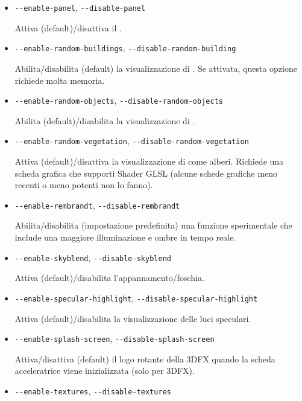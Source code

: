 \begin{itemize}
{\begin{itemize}
  \item{\texttt{-$ $-enable-panel}, \texttt{-$ $-disable-panel}}

  Attiva (default)/disattiva il .

  \item{\texttt{-$ $-enable-random-buildings}, \texttt{-$ $-disable-random-building}}

  Abilita/disabilita (default) la visualizzazione di .
  Se attivata, questa opzione richiede molta memoria.

  \item{\texttt{-$ $-enable-random-objects}, \texttt{-$ $-disable-random-objects}}

  Abilita (default)/disabilita la visualizzazione di .

  \item{\texttt{-$ $-enable-random-vegetation}, \texttt{-$ $-disable-random-vegetation}}

  Attiva (default)/disattiva la visualizzazione di  come alberi.
  Richiede una scheda grafica che supporti Shader GLSL (alcune schede grafiche meno
  recenti o meno potenti non lo fanno).

  \item{\texttt{-$ $-enable-rembrandt}, \texttt{-$ $-disable-rembrandt}}

  Abilita/disabilita (impostazione predefinita) una funzione sperimentale che
  include una maggiore illuminazione e ombre in tempo reale.

  \item{\texttt{-$ $-enable-skyblend}, \texttt{-$ $-disable-skyblend}}

  Attiva (default)/disabilita l'appannamento/foschia.

  \item{\texttt{-$ $-enable-specular-highlight}, \texttt{-$ $-disable-specular-highlight}}

  Attiva (default)/disabilita la visualizzazione delle luci speculari.

  \item{\texttt{-$ $-enable-splash-screen}, \texttt{-$ $-disable-splash-screen}}

  Attiva/disattiva (default) il logo rotante della 3DFX quando la scheda acceleratrice viene inizializzata (solo per 3DFX).

  \item{\texttt{-$ $-enable-textures}, \texttt{-$ $-disable-textures}}


\end{itemize}}
\end{itemize}
